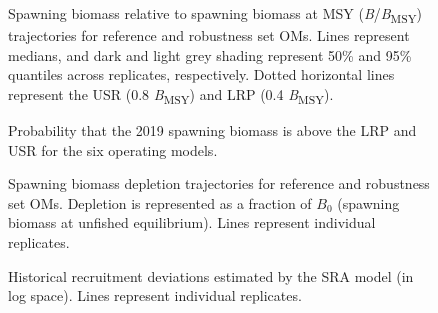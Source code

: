 \documentclass[11pt]{book}
\begin{document}
\begin{figure}[htb]

{\centering {} 

}

\caption{Spawning biomass relative to spawning biomass at MSY (\emph{B}/\emph{B}\textsubscript{MSY}) trajectories for reference and robustness set OMs. Lines represent medians, and dark and light grey shading represent 50\% and 95\% quantiles across replicates, respectively. Dotted horizontal lines represent the USR (0.8 \emph{B}\textsubscript{MSY}) and LRP (0.4 \emph{B}\textsubscript{MSY}).}\label{fig:biomass-om}
\end{figure}

\begin{figure}[htb]

{\centering {} 

}

\caption{Probability that the 2019 spawning biomass is above the LRP and USR for the six operating models.}\label{fig:ref-pt}
\end{figure}

\begin{figure}[htb]

{\centering {} 

}

\caption{Spawning biomass depletion trajectories for reference and robustness set OMs. Depletion is represented as a fraction of \(B_0\) (spawning biomass at unfished equilibrium). Lines represent individual replicates.}\label{fig:depletion-om}
\end{figure}

\begin{figure}[htb]

{\centering {} 

}

\caption{Historical recruitment deviations estimated by the SRA model (in log space). Lines represent individual replicates.}\label{fig:recdev-om}
\end{figure}
\end{document}
